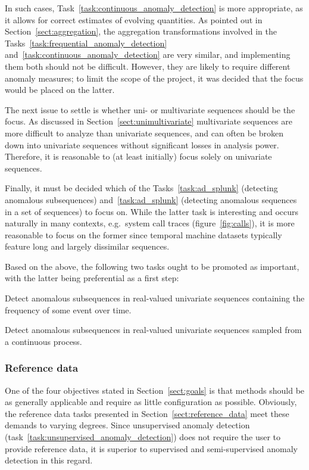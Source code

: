 In such cases, Task~\ref{task:continuous_anomaly_detection} is more appropriate, as it allows for correct estimates of evolving quantities. As pointed out in Section~\ref{sect:aggregation}, the aggregation transformations involved in the Tasks~\ref{task:frequential_anomaly_detection} and~\ref{task:continuous_anomaly_detection} are very similar, and implementing them both should not be difficult. However, they are likely to require different anomaly measures; to limit the scope of the project, it was decided that the focus would be placed on the latter.

The next issue to settle is whether uni- or multivariate sequences should be the focus. As discussed in Section~\ref{sect:unimultivariate} multivariate sequences are more difficult to analyze than univariate sequences, and can often be broken down into univariate sequences without significant losses in analysis power. Therefore, it is reasonable to (at least initially) focus solely on univariate sequences.

Finally, it must be decided which of the Tasks~\ref{task:ad_splunk} (detecting anomalous subsequences) and~\ref{task:ad_splunk} (detecting anomalous sequences in a set of sequences) to focus on. While the latter task is interesting and occurs naturally in many contexts, e.g.\ system call traces (figure~\ref{fig:calls}), it is more reasonable to focus on the former since temporal machine datasets typically feature long and largely dissimilar sequences.

Based on the above, the following two tasks ought to be promoted as important, with the latter being preferential as a first step:
\begin{task}
\label{task:frequency}
  Detect anomalous subsequences in real-valued univariate sequences containing the frequency of some event over time.
\end{task}
\begin{task}
\label{task:continuous}
  Detect anomalous subsequences in real-valued univariate sequences sampled from a continuous process.
\end{task}

\subsubsection{Reference data}

One of the four objectives stated in Section~\ref{sect:goals} is that methods should be as generally applicable and require as little configuration as possible. Obviously, the reference data tasks presented in Section~\ref{sect:reference_data} meet these demands to varying degrees. Since unsupervised anomaly detection (task~\ref{task:unsupervised_anomaly_detection}) does not require the user to provide reference data, it is superior to supervised and semi-supervised anomaly detection in this regard.

